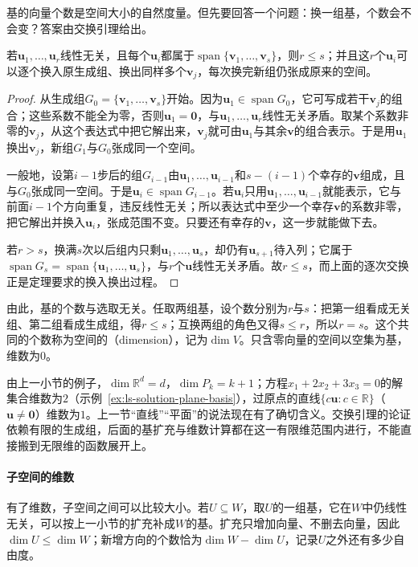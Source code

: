 基的向量个数是空间大小的自然度量。但先要回答一个问题：换一组基，个数会不会变？答案由交换引理给出。
\begin{theorem}[交换引理]
\label{thm:ls-exchange-lemma}
若$\bm u_1,\ldots,\bm u_r$线性无关，且每个$\bm u_i$都属于$\operatorname{span}\{\bm v_1,\ldots,\bm v_s\}$，则$r\leq s$；并且这$r$个$\bm u_i$可以逐个换入原生成组、换出同样多个$\bm v_j$，每次换完新组仍张成原来的空间。
\end{theorem}
\begin{proof}
从生成组$G_0=\{\bm v_1,\ldots,\bm v_s\}$开始。因为$\bm u_1\in\operatorname{span}G_0$，它可写成若干$\bm v_j$的组合；这些系数不能全为零，否则$\bm u_1=\bm0$，与$\bm u_1,\ldots,\bm u_r$线性无关矛盾。取某个系数非零的$\bm v_j$，从这个表达式中把它解出来，$\bm v_j$就可由$\bm u_1$与其余$\bm v$的组合表示。于是用$\bm u_1$换出$\bm v_j$，新组$G_1$与$G_0$张成同一个空间。

一般地，设第$i-1$步后的组$G_{i-1}$由$\bm u_1,\ldots,\bm u_{i-1}$和$s-(i-1)$个幸存的$\bm v$组成，且与$G_0$张成同一空间。于是$\bm u_i\in\operatorname{span}G_{i-1}$。若$\bm u_i$只用$\bm u_1,\ldots,\bm u_{i-1}$就能表示，它与前面$i-1$个方向重复，违反线性无关；所以表达式中至少一个幸存$\bm v$的系数非零，把它解出并换入$\bm u_i$，张成范围不变。只要还有幸存的$\bm v$，这一步就能做下去。

若$r>s$，换满$s$次以后组内只剩$\bm u_1,\ldots,\bm u_s$，却仍有$\bm u_{s+1}$待入列；它属于$\operatorname{span}G_s=\operatorname{span}\{\bm u_1,\ldots,\bm u_s\}$，与$r$个$\bm u$线性无关矛盾。故$r\leq s$，而上面的逐次交换正是定理要求的换入换出过程。
\end{proof}

由此，基的个数与选取无关。任取两组基，设个数分别为$r$与$s$：把第一组看成无关组、第二组看成生成组，得$r\leq s$；互换两组的角色又得$s\leq r$，所以$r=s$。这个共同的个数称为空间的（dimension），记为$\dim V$。只含零向量的空间以空集为基，维数为$0$。

由上一小节的例子，$\dim\mathbb R^d=d$，$\dim P_k=k+1$；方程$x_1+2x_2+3x_3=0$的解集合维数为$2$（示例~\ref{ex:ls-solution-plane-basis}），过原点的直线$\{c\bm u:c\in\mathbb R\}$（$\bm u\neq\bm0$）维数为$1$。上一节“直线”“平面”的说法现在有了确切含义。交换引理的论证依赖有限的生成组，后面的基扩充与维数计算都在这一有限维范围内进行，不能直接搬到无限维的函数展开上。

\paragraph{子空间的维数}
有了维数，子空间之间可以比较大小。若$U\subseteq W$，取$U$的一组基，它在$W$中仍线性无关，可以按上一小节的扩充补成$W$的基。扩充只增加向量、不删去向量，因此$\dim U\leq\dim W$；新增方向的个数恰为$\dim W-\dim U$，记录$U$之外还有多少自由度。

